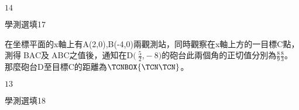 \begin{QUESTIONS}
\begin{QUESTION}
\begin{QBODY}
        \end{QBODY}
        \begin{QFROMS}
        \end{QFROMS}
        \begin{QTAGS}\end{QTAGS}
        \begin{QANS}
            $14$
        \end{QANS}
        \begin{QSOLLIST}
        \end{QSOLLIST}
        \begin{QEMPTYSPACE}
        \end{QEMPTYSPACE}
    \end{QUESTION}
    \begin{QUESTION}
        \begin{ExamInfo}{90}{學測}{選填}{17}
        \end{ExamInfo}
        \begin{ExamAnsRateInfo}{}{}{}{}
        \end{ExamAnsRateInfo}
        \begin{QBODY}
			在坐標平面的x軸上有A(2,0),B(-4,0)兩觀測站，同時觀察在x軸上方的一目標C點，測得BAC及ABC之值後，通知在$\text{D(}\ \frac{\text{5}}{\text{2}}\text{,}-\text{8)}$的砲台此兩個角的正切值分別為$\frac{8}{9}\frac{8}{3}$。那麼砲台D至目標C的距離為$\TCNBOX{\TCN\TCN}$。
        \end{QBODY}
        \begin{QFROMS}
        \end{QFROMS}
        \begin{QTAGS}\end{QTAGS}
        \begin{QANS}
            $13$
        \end{QANS}
        \begin{QSOLLIST}
        \end{QSOLLIST}
        \begin{QEMPTYSPACE}
        \end{QEMPTYSPACE}
    \end{QUESTION}
    \begin{QUESTION}
        \begin{ExamInfo}{90}{學測}{選填}{18}
        \end{ExamInfo}
        \begin{ExamAnsRateInfo}{}{}{}{}
        \end{ExamAnsRateInfo}
        \begin{QBODY}

\end{QBODY}
\end{QUESTION}
\end{QUESTIONS}
